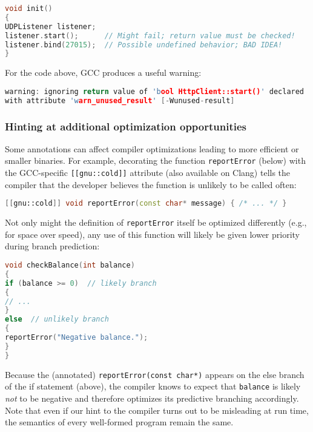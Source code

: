 \begin{lstlisting}[language=C++]
void init()
{
UDPListener listener;
listener.start();      // Might fail; return value must be checked!
listener.bind(27015);  // Possible undefined behavior; BAD IDEA!
}
\end{lstlisting}

\noindent For the code above, GCC produces a useful warning:

\begin{lstlisting}[language=C++]
warning: ignoring return value of 'bool HttpClient::start()' declared
with attribute 'warn_unused_result' [-Wunused-result]
\end{lstlisting}


\subsubsection[Hinting at additional optimization opportunities]{Hinting at additional optimization opportunities}\label{hinting-at-additional-optimization-opportunities}

Some annotations can affect compiler optimizations leading to more
efficient or smaller binaries. For example, decorating the function
\texttt{reportError} (below) with the GCC-specific
\texttt{[[gnu::cold]]} attribute (also available on Clang) tells the
compiler that the developer believes the function is unlikely to be
called often:

\begin{lstlisting}[language=C++]
[[gnu::cold]] void reportError(const char* message) { /* ... */ }
\end{lstlisting}

\noindent Not only might the definition of \texttt{reportError} itself be
optimized differently (e.g., for space over speed), any use of this
function will likely be given lower priority during branch \mbox{prediction}:

\begin{lstlisting}[language=C++]
void checkBalance(int balance)
{
if (balance >= 0)  // likely branch
{
// ...
}
else  // unlikely branch
{
reportError("Negative balance.");
}
}
\end{lstlisting}

\noindent Because the (annotated) \texttt{reportError(const}~\texttt{char*)}
appears on the else branch of the if statement (above), the compiler
knows to expect that \texttt{balance} is likely \emph{not} to be
negative and therefore optimizes its predictive branching accordingly.
Note that even if our hint to the compiler turns out to be misleading at
run time, the semantics of every well-formed program remain the same.

